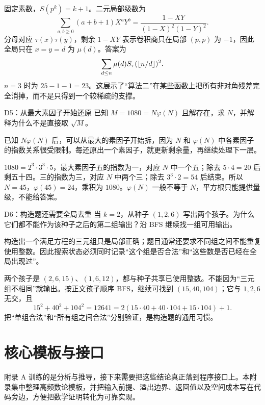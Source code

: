 \sol 固定素数，$S(p^k)=k+1$。二元局部级数为
\[
 \sum_{a,b\ge0}(a+b+1)X^aY^b
 =\frac{1-XY}{(1-X)^2(1-Y)^2}.
\]
分母对应 $\tau(x)\tau(y)$，剩余 $1-XY$ 表示卷积商只在局部 $(p,p)$ 为 $-1$，因此全局只在 $x=y=d$ 为 $\mu(d)$。答案为
\[
 \sum_{d\le n}\mu(d)S_\tau(\left\lfloor n/d\right\rfloor)^2.
\]
$n=3$ 时为 $25-1-1=23$。这展示了“算法二”在某些函数上把所有非对角残差完全消掉，而不是只得到一个较稀疏的支撑。


\begin{problem}{D5：从最大素因子开始还原}
已知 $M=1080=N\varphi(N)$ 且解存在，求 $N$，并解释为什么不是直接取 $\sqrt M$。
\end{problem}

\begin{pitfall}[讲解：先看这题到底在做什么]
已知 $N\varphi(N)$ 后，可以从最大的素因子开始拆，因为 $N$ 和 $\varphi(N)$ 中各素因子的指数关系很受限制。每还原出一个素因子，就更新剩余量，再继续处理下一层。
\end{pitfall}

\sol $1080=2^3\cdot3^3\cdot5$，最大素因子五的指数为一，对应 $N$ 中一个五；除去 $5\cdot4=20$ 后剩五十四。三的指数为三，对应 $N$ 中两个三；除去 $3^3\cdot2=54$ 后结束。所以 $N=45$，$\varphi(45)=24$，乘积为 $1080$。$\varphi(N)$ 一般不等于 $N$，平方根只能提供量级，不能给答案。


\begin{problem}{D6：构造题还需要全局去重}
当 $k=2$，从种子 $(1,2,6)$ 写出两个孩子。为什么它们都不能作为该种子之后的第二组输出？沿 BFS 继续找一组可用输出。
\end{problem}

\begin{pitfall}[讲解：先看这题到底在做什么]
构造出一个满足方程的三元组只是局部正确；题目通常还要求不同组之间不能重复使用整数。因此搜索状态必须同时记录“这个组是否合法”和“这些数是否已经在全局出现过”。
\end{pitfall}

\sol 两个孩子是 $(2,6,15)$、$(1,6,12)$，都与种子共享已使用整数。不能因为“三元组不相同”就输出。按正文孩子顺序 BFS，继续可找到 $(15,40,104)$；它与 $1,2,6$ 无交，且
\[
15^2+40^2+104^2=12641=2(15\cdot40+40\cdot104+15\cdot104)+1.
\]
把“单组合法”和“所有组之间合法”分别验证，是构造题的通用习惯。





\chapter{核心模板与接口}
\begin{chapterintro}[章节导读]
附录 A 训练的是分析与推导，接下来需要把这些结论真正落到程序接口上。本附录集中整理高频数论模板，并把输入前提、溢出边界、返回值以及空间成本写在代码旁边，方便把数学证明转化为可靠实现。
\end{chapterintro}

